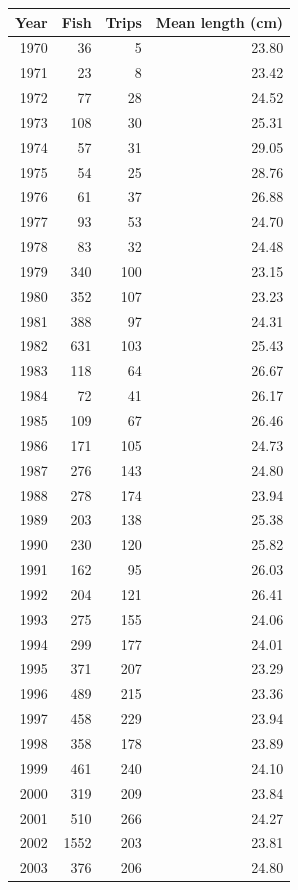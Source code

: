 \documentclass[12pt,]{article}
\begin{document}
\begin{table}[ht]
\label{tab:Fleet7_lengthsample}
\begin{tabular}{rrrr}
  \hline
Year & Fish & Trips & Mean length (cm) \\ 
  \hline
1970 &  36 &   5 & 23.80 \\ 
  1971 &  23 &   8 & 23.42 \\ 
  1972 &  77 &  28 & 24.52 \\ 
  1973 & 108 &  30 & 25.31 \\ 
  1974 &  57 &  31 & 29.05 \\ 
  1975 &  54 &  25 & 28.76 \\ 
  1976 &  61 &  37 & 26.88 \\ 
  1977 &  93 &  53 & 24.70 \\ 
  1978 &  83 &  32 & 24.48 \\ 
  1979 & 340 & 100 & 23.15 \\ 
  1980 & 352 & 107 & 23.23 \\ 
  1981 & 388 &  97 & 24.31 \\ 
  1982 & 631 & 103 & 25.43 \\ 
  1983 & 118 &  64 & 26.67 \\ 
  1984 &  72 &  41 & 26.17 \\ 
  1985 & 109 &  67 & 26.46 \\ 
  1986 & 171 & 105 & 24.73 \\ 
  1987 & 276 & 143 & 24.80 \\ 
  1988 & 278 & 174 & 23.94 \\ 
  1989 & 203 & 138 & 25.38 \\ 
  1990 & 230 & 120 & 25.82 \\ 
  1991 & 162 &  95 & 26.03 \\ 
  1992 & 204 & 121 & 26.41 \\ 
  1993 & 275 & 155 & 24.06 \\ 
  1994 & 299 & 177 & 24.01 \\ 
  1995 & 371 & 207 & 23.29 \\ 
  1996 & 489 & 215 & 23.36 \\ 
  1997 & 458 & 229 & 23.94 \\ 
  1998 & 358 & 178 & 23.89 \\ 
  1999 & 461 & 240 & 24.10 \\ 
  2000 & 319 & 209 & 23.84 \\ 
  2001 & 510 & 266 & 24.27 \\ 
  2002 & 1552 & 203 & 23.81 \\ 
  2003 & 376 & 206 & 24.80 \\ 

\end{tabular}
\end{table}
\end{document}
